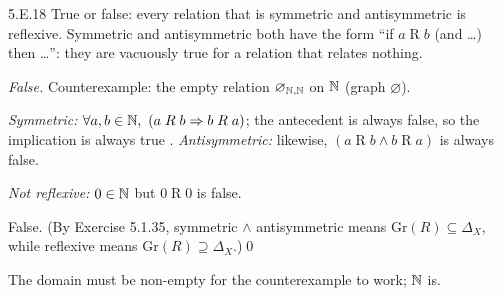 
\begin{bookex}[essential]{5.E.18}
True or false: every relation that is symmetric and antisymmetric is reflexive.
\solution
\given Symmetric and antisymmetric both have the form ``if $a\mathrel Rb$ (and \dots) then \dots'': they are vacuously true for a relation that relates nothing.
\begin{steps}
\item \emph{False.} Counterexample: the empty relation $\varnothing_{\mathbb{N},\mathbb{N}}$ on $\mathbb{N}$ (graph $\varnothing$).
\item \emph{Symmetric:} $\forall a,b\in\N,\ (a\mathrel Rb\Rightarrow b\mathrel Ra)$; the antecedent is always false, so the implication is always true . \emph{Antisymmetric:} likewise, $(a\mathrel Rb\wedge b\mathrel Ra)$ is always false.
\item \emph{Not reflexive:} $0\in\mathbb{N}$ but $0\mathrel R0$ is false.
\end{steps}
\conclusion False. (By Exercise 5.1.35, symmetric $\wedge$ antisymmetric means $\mathrm{Gr}(R)\subseteq\Delta_X$, while reflexive means $\mathrm{Gr}(R)\supseteq\Delta_X$.)\qed
\begin{compare}
\item The domain must be non-empty for the counterexample to work; $\mathbb{N}$ is.
\end{compare}
\end{bookex}

